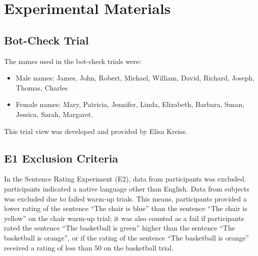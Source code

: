 \section{Experimental Materials}
\subsection{Bot-Check Trial}
The names used in the bot-check trials were: 
\begin{itemize}
\item Male names: James, John, Robert, Michael, William, David, Richard, Joseph, Thomas, Charles 
\item Female names: Mary, Patricia, Jennifer, Linda, Elizabeth, Barbara, Susan, Jessica, Sarah, Margaret. 
\end{itemize}
This trial view was developed and provided by Elisa Kreiss. 
\subsection{E1 Exclusion Criteria}
In the Sentence Rating Experiment (E2), data from  participants was excluded.  participants indicated a native language other than English. Data from  subjects was excluded due to failed warm-up trials. This means, participants provided a lower rating of the sentence “The chair is blue” than the sentence “The chair is yellow” on the chair warm-up trial; it was also counted as a fail if participants rated the sentence “The basketball is green” higher than the sentence “The basketball is orange”, or if the rating of the sentence “The basketball is orange” received a rating of less than 50 on the basketball trial.

